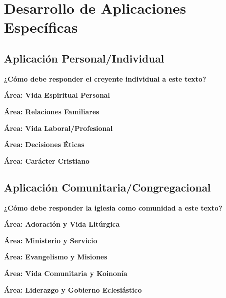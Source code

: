 \documentclass[11pt,a4paper]{article}
\begin{document}
\newpage

\section{Desarrollo de Aplicaciones Específicas}

\subsection{Aplicación Personal/Individual}

\begin{practicalbox}
\textbf{¿Cómo debe responder el creyente individual a este texto?}
\end{practicalbox}

\textbf{Área: Vida Espiritual Personal}
\vspace{2cm}

\textbf{Área: Relaciones Familiares}
\vspace{2cm}

\textbf{Área: Vida Laboral/Profesional}
\vspace{2cm}

\textbf{Área: Decisiones Éticas}
\vspace{2cm}

\textbf{Área: Carácter Cristiano}
\vspace{2cm}

\subsection{Aplicación Comunitaria/Congregacional}

\begin{congregationbox}
\textbf{¿Cómo debe responder la iglesia como comunidad a este texto?}
\end{congregationbox}

\textbf{Área: Adoración y Vida Litúrgica}
\vspace{2cm}

\textbf{Área: Ministerio y Servicio}
\vspace{2cm}

\textbf{Área: Evangelismo y Misiones}
\vspace{2cm}

\textbf{Área: Vida Comunitaria y Koinonía}
\vspace{2cm}

\textbf{Área: Liderazgo y Gobierno Eclesiástico}
\vspace{2cm}

\newpage
\end{document}
